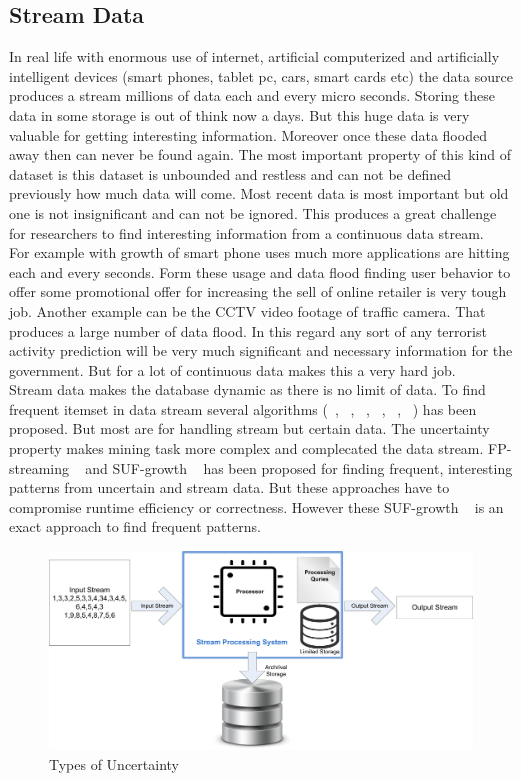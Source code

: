 \subsection{Stream Data}
In real life with enormous use of internet, artificial computerized and artificially intelligent devices (smart phones, tablet pc, cars, smart cards etc) the data source produces a stream millions of data each and every micro seconds. Storing these data in some storage is out of think now a days. But this huge data is very valuable for getting interesting information. Moreover once these data flooded away then can never be found again. The most important property of this kind of dataset is this dataset is unbounded and restless and can not be defined previously how much data will come. Most recent data is most important but old one is not insignificant and can not be ignored. This produces a great challenge for researchers to find interesting information from a continuous data stream.\\
For example with growth of smart phone uses much more applications are hitting each and every seconds. Form these usage and data flood finding user behavior to offer some promotional offer for increasing the sell of online retailer is very tough job. Another example can be the CCTV video footage of traffic camera. That produces a large number of data flood. In this regard any sort of any terrorist activity prediction will be very much significant and necessary information for the government. But for a lot of continuous data makes this a very hard job.\\
Stream data makes the database dynamic as there is no limit of data. To find frequent itemset in data stream several algorithms (~\cite{uncertain_01}, ~\cite{uncertain_02}, ~\cite{uncertain_03}, ~\cite{uncertain_04}, ~\cite{uncertain_05}, ~\cite{uncertain_06}) has been proposed. But most are for handling stream but certain data. The uncertainty property makes mining task more complex and complecated the data stream. FP-streaming ~\cite{suf_growth} and  SUF-growth ~\cite{suf_growth} has been proposed for finding frequent, interesting patterns from uncertain and stream data. But these approaches have to compromise runtime efficiency or correctness. However these SUF-growth ~\cite{suf_growth} is an exact approach to find frequent patterns.
\begin{figure}
\centering
  \includegraphics[width=.9\textwidth]{images/stream_data.jpg}
\caption{Types of Uncertainty}
\label{figure:stream_data}
\end{figure}


